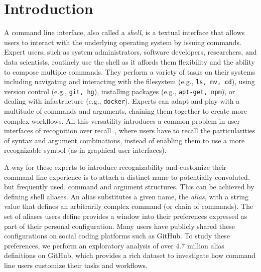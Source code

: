 \section{Introduction}

A command line interface, also called a \emph{shell}, is a textual interface that allows users to interact with the underlying operating system by issuing commands.
Expert users, such as system administrators, software developers, researchers, and data scientists, routinely use the shell as it affords them flexibility and the ability to compose multiple commands.
They perform a variety of tasks on their systems including navigating and interacting with the filesystem (e.g., \verb|ls, mv, cd|), using version control (e.g., \verb|git, hg|), installing packages (e.g., \verb|apt-get, npm|), or dealing with infastructure (e.g., \verb|docker|).
Experts can adapt and play with a multitude of commands and arguments, chaining them together to create more complex workflows.
All this versatility introduces a common problem in user interfaces of recognition over recall~\cite{nielsen:05}, where users have to recall the particularities of syntax and argument combinations, instead of enabling them to use a more recognizable symbol (as in graphical user interfaces).

A way for these experts to introduce recognizability and customize their command line experience is to attach a distinct name to potentially convoluted, but frequently used, command and argument structures.
This can be achieved by defining shell aliases.
An alias substitutes a given name, the \emph{alias}, with a string value that defines an arbitrarily complex command (or chain of commands).
The set of aliases users define provides a window into their preferences expressed as part of their personal configuration.
Many users have publicly shared these configurations on social coding platforms such as GitHub.
To study these preferences, we perform an exploratory analysis of over 4.7 million alias definitions on GitHub, which provides a rich dataset to investigate how command line users customize their tasks and workflows.

